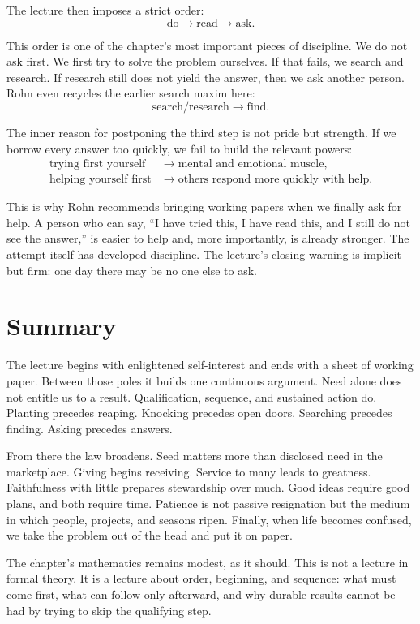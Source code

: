 The lecture then imposes a strict order:
\begin{equation}
\text{do} \rightarrow \text{read} \rightarrow \text{ask}.
\end{equation}

This order is one of the chapter's most important pieces of discipline. We do not ask first. We first try to solve the problem ourselves. If that fails, we search and research. If research still does not yield the answer, then we ask another person. Rohn even recycles the earlier search maxim here:
\begin{equation}
\text{search/research} \rightarrow \text{find}.
\end{equation}

The inner reason for postponing the third step is not pride but strength. If we borrow every answer too quickly, we fail to build the relevant powers:
\begin{align}
\text{trying first yourself} &\rightarrow \text{mental and emotional muscle}, \\
\text{helping yourself first} &\rightarrow \text{others respond more quickly with help}.
\end{align}

This is why Rohn recommends bringing working papers when we finally ask for help. A person who can say, ``I have tried this, I have read this, and I still do not see the answer,'' is easier to help and, more importantly, is already stronger. The attempt itself has developed discipline. The lecture's closing warning is implicit but firm: one day there may be no one else to ask.

\section{Summary}

The lecture begins with enlightened self-interest and ends with a sheet of working paper. Between those poles it builds one continuous argument. Need alone does not entitle us to a result. Qualification, sequence, and sustained action do. Planting precedes reaping. Knocking precedes open doors. Searching precedes finding. Asking precedes answers.

From there the law broadens. Seed matters more than disclosed need in the marketplace. Giving begins receiving. Service to many leads to greatness. Faithfulness with little prepares stewardship over much. Good ideas require good plans, and both require time. Patience is not passive resignation but the medium in which people, projects, and seasons ripen. Finally, when life becomes confused, we take the problem out of the head and put it on paper.

The chapter's mathematics remains modest, as it should. This is not a lecture in formal theory. It is a lecture about order, beginning, and sequence: what must come first, what can follow only afterward, and why durable results cannot be had by trying to skip the qualifying step.